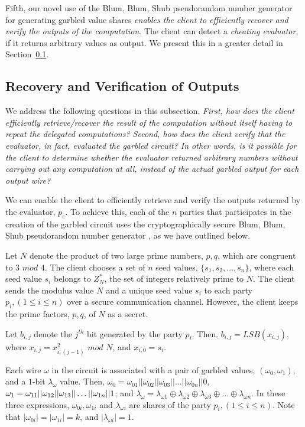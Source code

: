 \documentclass[10pt,journal,cspaper,compsoc]{IEEEtran}
\begin{document}
Fifth, our novel use of the Blum, Blum, Shub pseudorandom number generator for generating garbled value shares {\em enables the client to efficiently recover and verify the outputs of the computation}. The client can detect a {\em cheating evaluator}, if it returns arbitrary values as output. We present this in a greater detail in Section~\ref{sec_output_verification}.\vspace{-1 mm}


\subsection{Recovery and Verification of Outputs}
\label{sec_output_verification}

We address the following questions in this subsection. {\em First, how does the client efficiently retrieve/recover the result of the computation without itself having to repeat the delegated computations? Second, how does the client verify that the evaluator, in fact, evaluated the garbled circuit? In other words, is it possible for the client to determine whether the evaluator returned arbitrary numbers without carrying out any computation at all, instead of the actual garbled output for each output wire?}


We can enable the client to efficiently retrieve and verify the outputs returned by the evaluator, $p_e$. To achieve this, each of the $n$ parties that participates in the creation of the garbled circuit uses the cryptographically secure Blum, Blum, Shub pseudorandom number generator \cite{blum86,schneier95}, as we have outlined below.


Let $N$ denote the product of two large prime numbers, $p,q$, which are congruent to $3$ $mod$ $4$. The client chooses a set of $n$ seed values, $\{s_1, s_2, \ldots, s_n\}$, where each seed value $s_i$ belongs to $Z_N^*$, the set of integers relatively prime to $N$. The client sends the modulus value $N$ and a unique seed value $s_i$ to each party $p_i, (1\le i\le n)$ over a secure communication channel. However, the client keeps the prime factors, $p,q$, of $N$ as a secret.


Let $b_{i,j}$ denote the $j^{th}$ bit generated by the party $p_i$. Then, $b_{i,j}=LSB(x_{i,j})$, where $x_{i,j}=x_{i,(j-1)}^2$ $mod$ $N$, and $x_{i,0}=s_i$.


Each wire $\omega$ in the circuit is associated with a pair of garbled values, $(\omega_0,\omega_1)$, and a $1$-bit $\lambda_\omega$ value. Then, $\omega_0=\omega_{01}  || \omega_{02}  || \omega_{03}  || \ldots || \omega_{0n}  || 0$, $\omega_1=\omega_{11}  || \omega_{12}  || \omega_{13}  || \ldots ||\\ \omega_{1n}  || 1$; and $\lambda_\omega=\lambda_{\omega 1}\oplus \lambda_{\omega 2}\oplus \lambda_{\omega 3} \oplus \ldots \oplus \lambda_{\omega n}$. In these three expressions, $\omega_{0i},\omega_{1i}$ and $\lambda_{\omega i}$ are shares of the party $p_i,(1\le i\le n)$. Note that $|\omega_{0i}|=|\omega_{1i} |=k$, and $|\lambda_{\omega i}|=1$.
\end{document}

